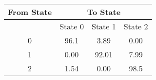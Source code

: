 \documentclass{article}
\begin{document}
\begin{tabular}{c c c c}
    From State & \multicolumn{3}{c}{To State} \\
    \hline
     & State 0 & State 1 & State 2 \\
    \hline
    0 & 96.1 & 3.89 & 0.00 \\
    1 & 0.00 & 92.01 & 7.99 \\
    2 & 1.54 & 0.00 & 98.5 \\
\end{tabular}
\end{document}
